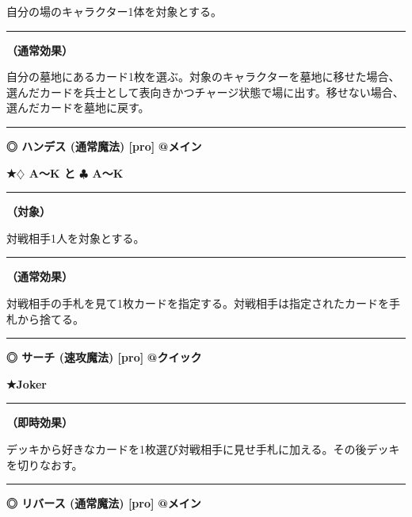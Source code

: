 \documentclass[twocolumn,a5paper,papersize,10pt]{jarticle}
\begin{document}
自分の場のキャラクター1体を対象とする。
\vspace{1mm}%
\hrule height 0.1mm depth 0mm width 66.5mm %
\vspace{1mm}%

{\bf（通常効果）}

自分の墓地にあるカード1枚を選ぶ。対象のキャラクターを墓地に移せた場合、選んだカードを兵士として表向きかつチャージ状態で場に出す。移せない場合、選んだカードを墓地に戻す。
\vspace{2mm} %
\hrule height 0.5mm depth 0mm width 66.5mm %
\vspace{1mm} %
{\small\bf ◎ ハンデス {\scriptsize (通常魔法) [pro]}} %
\hfill 
{\footnotesize\bf @メイン }

{\footnotesize\bf ★{\normalsize $\diamondsuit$} A〜K と {\normalsize $\clubsuit$} A〜K}

\vspace{1mm}%
\hrule height 0.1mm depth 0mm width 66.5mm %
\vspace{1mm}%
{\bf（対象）}

対戦相手1人を対象とする。
\vspace{1mm}%
\hrule height 0.1mm depth 0mm width 66.5mm %
\vspace{1mm}%

{\bf（通常効果）}

対戦相手の手札を見て1枚カードを指定する。対戦相手は指定されたカードを手札から捨てる。
\vspace{2mm} %
\hrule height 0.5mm depth 0mm width 66.5mm %
\vspace{1mm} %
{\small\bf ◎ サーチ {\scriptsize (速攻魔法) [pro]}} %
\hfill 
{\footnotesize\bf @クイック }

{\footnotesize\bf ★Joker}

\vspace{1mm}%
\hrule height 0.1mm depth 0mm width 66.5mm %
\vspace{1mm}%

{\bf（即時効果）}

デッキから好きなカードを1枚選び対戦相手に見せ手札に加える。その後デッキを切りなおす。
\vspace{2mm} %
\hrule height 0.5mm depth 0mm width 66.5mm %
\vspace{1mm} %
{\small\bf ◎ リバース {\scriptsize (通常魔法) [pro]}} %
\hfill 
{\footnotesize\bf @メイン }
\end{document}

